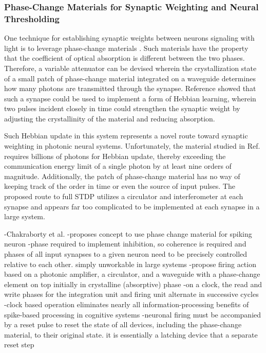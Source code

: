 \subsubsection{Phase-Change Materials for Synaptic Weighting and Neural Thresholding}
One technique for establishing synaptic weights between neurons signaling with light is to leverage phase-change materials \cite{chri2017}. Such materials have the property that the coefficient of optical absorption is different between the two phases. Therefore, a variable attenuator can be devised wherein the crystallization state of a small patch of phase-change material integrated on a waveguide determines how many photons are transmitted through the synapse. Reference \cite{chri2017} showed that such a synapse could be used to implement a form of Hebbian learning, wherein two pulses incident closely in time could strengthen the synaptic weight by adjusting the crystallinity of the material and reducing absorption. 

Such Hebbian update in this system represents a novel route toward synaptic weighting in photonic neural systems. Unfortunately, the material studied in Ref.\,\cite{chri2017} requires billions of photons for Hebbian update, thereby exceeding the communication energy limit of a single photon by at least nine orders of magnitude. Additionally, the patch of phase-change material has no way of keeping track of the order in time or even the source of input pulses. The proposed route to full STDP utilizes a circulator and interferometer at each synapse and appears far too complicated to be implemented at each synapse in a large system. 

\cite{chsa2018}
-Chakraborty et al.
-proposes concept to use phase change material for spiking neuron
-phase required to implement inhibition, so coherence is required and phases of all input synapses to a given neuron need to be precisely controlled relative to each other. simply unworkable in large systems
-propose firing action based on a photonic amplifier, a circulator, and a waveguide with a phase-change element on top initially in crystalline (absorptive) phase
-on a clock, the read and write phases for the integration unit and firing unit alternate in successive cycles
-clock based operation eliminates nearly all information-processing benefits of spike-based processing in cognitive systems
-neuronal firing must be accompanied by a reset pulse to reset the state of all devices, including the phase-change material, to their original state. it is essentially a latching device that a separate reset step

